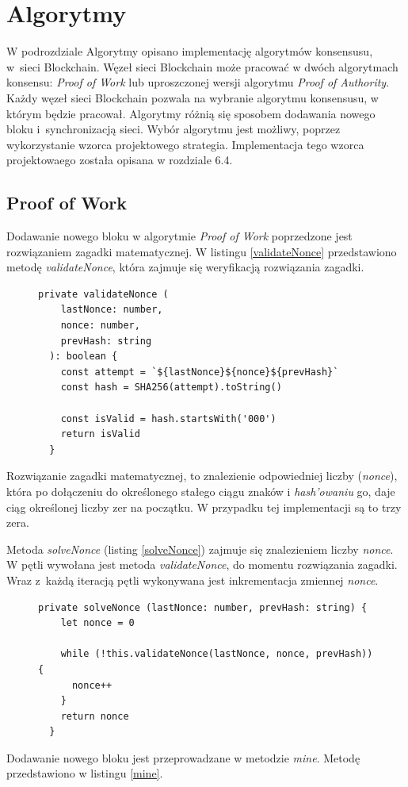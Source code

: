 \documentclass[a4paper,12pt]{book}
\begin{document}
\section{Algorytmy}

W podrozdziale Algorytmy opisano implementację algorytmów konsensusu, w~sieci Blockchain. Węzeł sieci Blockchain może pracować w dwóch algorytmach konsensu: \textit{Proof of Work} lub uproszczonej wersji algorytmu \textit{Proof of Authority}. Każdy węzeł sieci Blockchain pozwala na wybranie algorytmu konsensusu, w którym będzie pracował. Algorytmy różnią się sposobem dodawania nowego bloku i~synchronizacją sieci. Wybór algorytmu jest możliwy, poprzez wykorzystanie wzorca projektowego strategia. Implementacja tego wzorca projektowaego została opisana w rozdziale 6.4.

\subsection{Proof of Work}

Dodawanie nowego bloku w algorytmie \textit{Proof of Work} poprzedzone jest rozwiązaniem zagadki matematycznej. W listingu \ref{validateNonce} przedstawiono metodę \textit{validateNonce}, która zajmuje się weryfikacją rozwiązania zagadki.

\begin{figure}  
  \centering
\begin{lstlisting}[style=ES6, caption={Metoda \textit{validateNonce}.}, label={validateNonce}]
private validateNonce (
    lastNonce: number,
    nonce: number,
    prevHash: string
  ): boolean {
    const attempt = `${lastNonce}${nonce}${prevHash}`
    const hash = SHA256(attempt).toString()

    const isValid = hash.startsWith('000')
    return isValid
  }
\end{lstlisting}
\end{figure}
Rozwiązanie zagadki matematycznej, to znalezienie odpowiedniej liczby (\textit{nonce}), która po dołączeniu do określonego stałego ciągu znaków i \textit{hash’owaniu} go, daje ciąg określonej liczby zer na początku. W przypadku tej implementacji są to trzy zera.
 
Metoda \textit{solveNonce} (listing \ref{solveNonce}) zajmuje się znalezieniem liczby \textit{nonce}. W pętli wywołana jest metoda \textit{validateNonce}, do momentu rozwiązania zagadki. Wraz z~każdą iteracją pętli wykonywana jest inkrementacja zmiennej \textit{nonce}.
 
\begin{figure}  
  \centering
\begin{lstlisting}[style=ES6, caption={Metoda \textit{solveNonce}.}, label={solveNonce}]
private solveNonce (lastNonce: number, prevHash: string) {
    let nonce = 0

    while (!this.validateNonce(lastNonce, nonce, prevHash)) {
      nonce++
    }
    return nonce
  }
\end{lstlisting}
\end{figure}
Dodawanie nowego bloku jest przeprowadzane w metodzie \textit{mine}. Metodę przedstawiono w listingu \ref{mine}.
\end{document}
